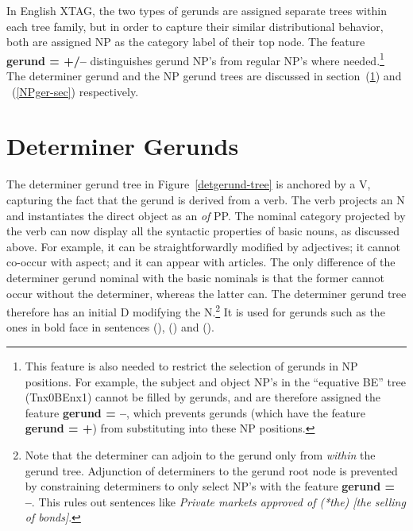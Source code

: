 
In English XTAG, the two types of gerunds are assigned separate
trees within each tree family, but in order to capture their similar
distributional behavior, both are assigned NP as the category label of
their top node. The feature {\bf gerund = +/--} distinguishes gerund NP's from
regular NP's where needed.\footnote{This feature is also needed to restrict
the selection of gerunds in NP positions. For example, the subject and
object NP's in the ``equative BE'' tree (Tnx0BEnx1) cannot be filled by
gerunds, and are therefore assigned the feature {\bf
gerund = --}, which prevents gerunds (which have the feature {\bf gerund =
+}) from substituting into these NP positions.} The determiner gerund 
and the NP gerund trees are discussed in section~(\ref{detger-sec}) and
~(\ref{NPger-sec}) respectively.

\section{Determiner Gerunds}
\label{detger-sec}
The determiner gerund tree in Figure~\ref{detgerund-tree} is anchored by a
V, capturing the fact that the gerund is derived from a verb. The verb
projects an N and instantiates the direct object as an {\it of} PP. The
nominal category projected by the verb can now display all the syntactic
properties of basic nouns, as discussed above. For example, it can be
straightforwardly modified by adjectives; it cannot co-occur with aspect;
and it can appear with articles. The only difference of the determiner
gerund nominal with the basic nominals is that the former cannot occur
without the determiner, whereas the latter can. The determiner gerund 
tree therefore has an initial D modifying the N.\footnote{Note that
the determiner can adjoin to the gerund only from {\it within} the gerund
tree. Adjunction of determiners to the gerund root node is prevented by
constraining determiners to only select NP's with the feature {\bf gerund = --}.
This rules out sentences like {\it Private markets approved of (*the) [the
selling of bonds]}.} It is used for gerunds such as the ones in bold face
in sentences (), () and ().

